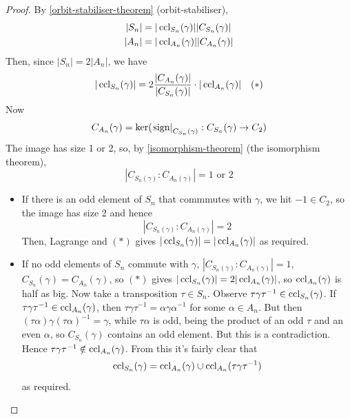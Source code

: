 \documentclass{../template/note}
\begin{document}
    \begin{proof}
        By \cref{orbit-stabiliser-theorem} (orbit-stabiliser),
        \begin{align*}
            |S_n| &= |\operatorname{ccl}_{S_n}(\gamma)||C_{S_n}(\gamma)| \\
            |A_n| &= |\operatorname{ccl}_{A_n}(\gamma)||C_{A_n}(\gamma)|
        \end{align*}
        Then, since \(|S_n| = 2|A_n|\), we have
        \begin{align*}
            |\operatorname{ccl}_{S_n}(\gamma)| = 2 \frac{|C_{A_n}(\gamma)|}{|C_{S_n}(\gamma)|} \cdot |\operatorname{ccl}_{A_n}(\gamma)| && (*)
        \end{align*}
        Now
        \[
            C_{A_n}(\gamma) = \ker(\left.\operatorname{sign}\right|_{C_{S_n}(\gamma)}: C_{S_n}(\gamma) \to C_2)
        \]
        The image has size 1 or 2, so, by \cref{isomorphism-theorem} (the isomorphism theorem),
        \[
            |C_{S_n(\gamma)} : C_{A_n(\gamma)}| = 1 \text{ or } 2
        \]
        \begin{itemize}
            \item If there is an odd element of \(S_n\) that commmutes with \(\gamma\), we hit \(-1 \in C_2\), so the image has size 2 and hence
            \[
                |C_{S_n(\gamma)} : C_{A_n(\gamma)}| = 2
            \]
            Then, Lagrange and \((*)\) gives \(|\operatorname{ccl}_{S_n}(\gamma)| = |\operatorname{ccl}_{A_n}(\gamma)|\) as required.
            \item If no odd elements of \(S_n\) commute with \(\gamma\), \(|C_{S_n(\gamma)} : C_{A_n(\gamma)}| = 1\), \(C_{S_n}(\gamma) = C_{A_n}(\gamma)\), so \((*)\) gives \(|\operatorname{ccl}_{S_n}(\gamma)| = 2|\operatorname{ccl}_{A_n}(\gamma)|\), so \(\operatorname{ccl}_{A_n}(\gamma)\) is half as big. Now take a transposition \(\tau \in S_n\). Observe \(\tau \gamma \tau^{-1} \in \operatorname{ccl}_{S_n}(\gamma)\). If \(\tau \gamma \tau^{-1} \in \operatorname{ccl}_{A_n}(\gamma)\), then \(\tau \gamma \tau^{-1} = \alpha \gamma \alpha^{-1}\) for some \(\alpha \in A_n\). But then \((\tau \alpha) \gamma (\tau \alpha)^{-1} = \gamma\), while \(\tau \alpha\) is odd, being the product of an odd \(\tau\) and an even \(\alpha\), so \(C_{S_n}(\gamma)\) contains an odd element. But this is a contradiction. Hence \(\tau \gamma \tau^{-1} \notin \operatorname{ccl}_{A_n}(\gamma)\). From this it's fairly clear that 
            \[
                \operatorname{ccl}_{S_n}(\gamma) = \operatorname{ccl}_{A_n}(\gamma) \cup \operatorname{ccl}_{A_n}(\tau \gamma \tau^{-1})
            \]
            as required.
        \end{itemize}
    \end{proof}
    
\end{document}
